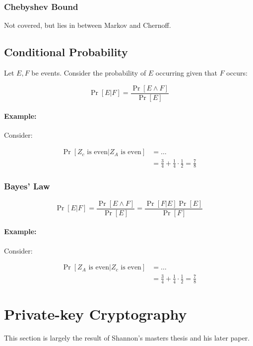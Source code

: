 \documentclass{idc_msc}
\begin{document}
\subsubsection{Chebyshev Bound}

Not covered, but lies in between Markov and Chernoff.

\subsection{Conditional Probability}

Let \(E, F\) be events. Consider the probability of \(E\) occurring given that \(F\) occurs:

\[
  \Pr[E|F] = \frac{\Pr[E \land F]}{\Pr[E]}
\]

\paragraph{Example:}

Consider:

\[
\begin{aligned}
  \Pr[Z_c \text{ is even} | Z_A \text{ is even}] &= \ldots \\
  &= \frac{3}{4} + \frac{1}{4} \cdot \frac{1}{2} = \frac{7}{8}
\end{aligned}
\]

\subsubsection{Bayes' Law}

\[
  \Pr[E|F] = \frac{\Pr[E \land F]}{\Pr[E]} = \frac{\Pr[F|E]\Pr[E]}{\Pr[F]}
\]

\paragraph{Example:}

Consider:

\[
\begin{aligned}
  \Pr[Z_A \text{ is even} | Z_c \text{ is even}] &= \ldots \\
  &= \frac{3}{4} + \frac{1}{4} \cdot \frac{1}{2} = \frac{7}{8}
\end{aligned}
\]

\clearpage
\section{Private-key Cryptography}

This section is largely the result of Shannon's masters thesis\cite{Shannon:5057767} and his later paper\cite{Shannon:1949:CTSS:656715}.
\end{document}
